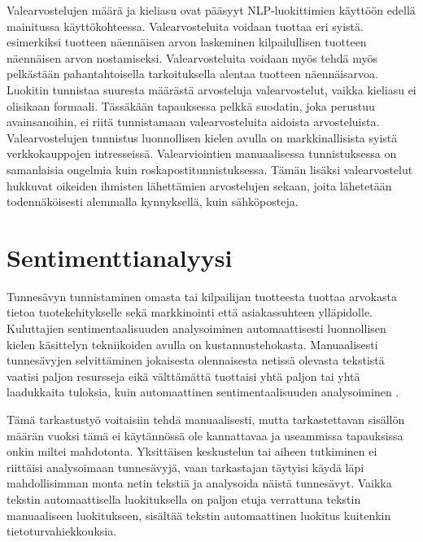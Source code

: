 Valearvostelujen määrä ja kieliasu ovat pääsyyt NLP-luokittimien käyttöön edellä mainitussa käyttökohteessa. Valearvosteluita voidaan tuottaa eri syistä. esimerkiksi tuotteen näennäisen arvon laskeminen kilpailullisen tuotteen näennäisen arvon nostamiseksi.  Valearvosteluita voidaan myös tehdä myös pelkästään pahantahtoisella tarkoituksella alentaa tuotteen näennäisarvoa. Luokitin tunnistaa suuresta määrästä arvosteluja valearvostelut, vaikka kieliasu ei olisikaan formaali. Tässäkään tapauksessa pelkkä suodatin, joka perustuu avainsanoihin, ei riitä tunnistamaan valearvosteluita aidoista arvosteluista. Valearvostelujen tunnistus luonnollisen kielen avulla on markkinallisista syistä verkkokauppojen intresseissä. Valearviointien manuaalisessa tunnistuksessa on samanlaisia ongelmia kuin roskapostitunnistuksessa. Tämän lisäksi valearvostelut hukkuvat oikeiden ihmisten lähettämien arvostelujen sekaan, joita lähetetään todennäköisesti alemmalla kynnyksellä, kuin sähköposteja.

\section{Sentimenttianalyysi}

Tunnesävyn tunnistaminen omasta tai kilpailijan tuotteesta tuottaa arvokasta tietoa tuotekehitykselle sekä markkinointi että asiakassuhteen ylläpidolle. Kuluttajien sentimentaalisuuden analysoiminen automaattisesti luonnollisen kielen käsittelyn tekniikoiden avulla on kustannustehokasta. Manuaalisesti tunnesävyjen selvittäminen jokaisesta olennaisesta netissä olevasta tekstistä vaatisi paljon resursseja eikä välttämättä tuottaisi yhtä paljon tai yhtä laadukkaita tuloksia, kuin automaattinen sentimentaalisuuden analysoiminen \citep{sentimentality}.

Tämä tarkastustyö voitaisiin tehdä manuaalisesti, mutta tarkastettavan sisällön määrän vuoksi tämä ei käytännössä ole kannattavaa ja useammissa tapauksissa onkin miltei mahdotonta. Yksittäisen keskustelun tai aiheen tutkiminen ei riittäisi analysoimaan tunnesävyjä, vaan tarkastajan täytyisi käydä läpi mahdollisimman monta netin tekstiä ja analysoida näistä tunnesävyt. Vaikka tekstin automaattisella luokituksella on paljon etuja verrattuna tekstin manuaaliseen luokitukseen, sisältää tekstin automaattinen luokitus kuitenkin tietoturvahiekkouksia.